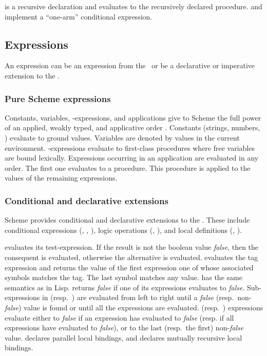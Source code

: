 \noindent
{} is a recursive declaration and evaluates to the recursively
declared procedure.   and  implement a
``one-arm'' conditional expression.


\subsection{Expressions}

An expression can be an expression from the \lc\ or be a declarative
or imperative extension to the \lc.

\subsubsection{Pure Scheme expressions}

Constants, variables, \lam-expressions, and applications give to
Scheme the full power of an applied, weakly typed, and applicative
order \lc.  Constants (strings, numbers, \etc) evaluate to ground
values.  Variables are denoted by values in the current environment.
\lam-expressions evaluate to first-class procedures where free
variables are bound lexically.  Expressions occurring in an
application are evaluated in any order.  The first one evaluates to a
procedure.  This procedure is applied to the values of the remaining
expressions.

\subsubsection{Conditional and declarative extensions}

Scheme provides conditional and declarative extensions to the \lc.
These include conditional expressions (, ,
), logic operations (, ), and local
definitions (, ).

 evaluates its test-expression.  If the result is not the
boolean value {\em false}, then the consequent is evaluated, otherwise
the alternative is evaluated.   evaluates the tag
expression and returns the value of the first expression one of whose
associated symbols matches the tag.  The last symbol 
matches any value.   has the same semantics as in Lisp.
 returns {\em false} if one of its expressions evaluates to
{\em false}.  Sub-expressions in  (resp.\ ) are
evaluated from left to right until a {\em false} (resp.\ non-{\em
false}) value is found or until all the expressions are evaluated.
 (resp.\ ) expressions evaluate either to {\em
false} if an expression has evaluated to {\em false} (resp. if all
expressions have evaluated to {\em false}), or to the last (resp.\ the
first) non-{\em false} value.   declares parallel local
bindings, and  declares mutually recursive local
bindings.

